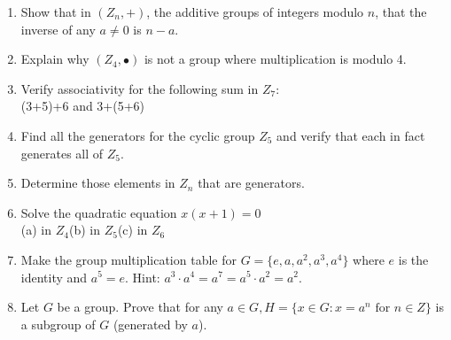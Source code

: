 \documentclass[12pt]{book}
\theoremstyle{definition}
\begin{document}
\begin{enumerate}
\item Show that in $(Z_n,+)$, the additive groups of integers modulo $n$, that the inverse of any $a\neq0$ is $n-a$.
\item Explain why $(Z_4,\bullet)$ is not a group where multiplication is modulo 4.
\item Verify associativity for the following sum in $Z_7$:\\
(3+5)+6 and 3+(5+6)
\item Find all the generators for the cyclic group $Z_5$ and verify that each in fact generates all of $Z_5$.
\item Determine those elements in $Z_n$ that are generators.
\item Solve the quadratic equation $x(x+1)=0$\\
(a) in $Z_4$\qquad (b) in $Z_5$\qquad (c) in $Z_6$
\item Make the group multiplication table for $G=\{e,a, a^2,a^3,a^4\}$ where $e$ is the identity and $a^5=e$.  Hint: $a^3\cdot a^4=a^7=a^5\cdot a^2 = a^2$.
\item Let $G$ be a group.  Prove that for any $a\in G, H=\{x\in G: x=a^n \text{ for }n\in Z\}$ is a subgroup of $G$ (generated by $a$).
\end{enumerate}
\end{document}
